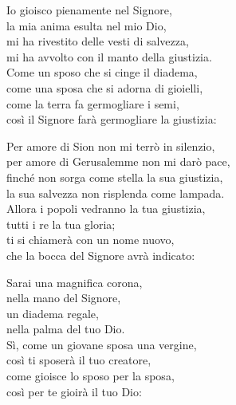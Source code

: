 
\strofa Io gioisco pienamente nel Signore,\\
la mia anima esulta nel mio Dio,\\
mi ha rivestito delle vesti di salvezza,\\
mi ha avvolto con il manto della giustizia.\\
Come un sposo che si cinge il diadema,\\
come una sposa che si adorna di gioielli,\\
come la terra fa germogliare i semi,\\
così il Signore farà germogliare la giustizia:

\spazio


\spazio

\strofa Per amore di Sion non mi terrò in silenzio,\\
per amore di Gerusalemme non mi darò pace,\\
finché non sorga come stella la sua giustizia,\\
la sua salvezza non risplenda come lampada.\\
Allora i popoli vedranno la tua giustizia,\\
tutti i re la tua gloria;\\
ti si chiamerà con un nome nuovo,\\
che la bocca del Signore avrà indicato:

\spazio


\spazio

\strofa Sarai una magnifica corona,\\
nella mano del Signore,\\
un diadema regale,\\
nella palma del tuo Dio.\\
Sì, come un giovane sposa una vergine,\\
così ti sposerà il tuo creatore,\\
come gioisce lo sposo per la sposa,\\
così per te gioirà il tuo Dio:

\spazio

